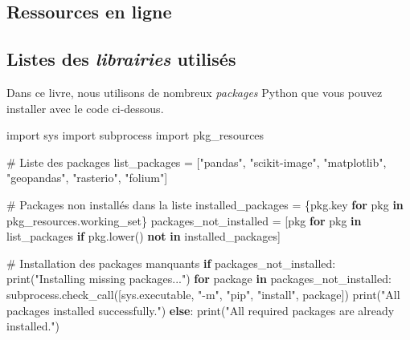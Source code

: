 \documentclass[
  letterpaper,
  DIV=11,
  numbers=noendperiod]{scrreprt}
\newenvironment{Shaded}{\begin{snugshade}}{\end{snugshade}}
\newcommand{\BuiltInTok}[1]{\textcolor[rgb]{0.00,0.23,0.31}{#1}}
\newcommand{\CommentTok}[1]{\textcolor[rgb]{0.37,0.37,0.37}{#1}}
\newcommand{\ControlFlowTok}[1]{\textcolor[rgb]{0.00,0.23,0.31}{\textbf{#1}}}
\newcommand{\ImportTok}[1]{\textcolor[rgb]{0.00,0.46,0.62}{#1}}
\newcommand{\KeywordTok}[1]{\textcolor[rgb]{0.00,0.23,0.31}{\textbf{#1}}}
\newcommand{\NormalTok}[1]{\textcolor[rgb]{0.00,0.23,0.31}{#1}}
\newcommand{\OperatorTok}[1]{\textcolor[rgb]{0.37,0.37,0.37}{#1}}
\newcommand{\StringTok}[1]{\textcolor[rgb]{0.13,0.47,0.30}{#1}}
\begin{document}
\subsection*{Ressources en ligne}\label{ressources-en-ligne}

\subsection*{\texorpdfstring{Listes des \emph{librairies}
utilisés}{Listes des librairies utilisés}}\label{sect0071}

Dans ce livre, nous utilisons de nombreux \emph{packages} Python que
vous pouvez installer avec le code ci-dessous.

\begin{Shaded}
\begin{Highlighting}[]
\ImportTok{import}\NormalTok{ sys}
\ImportTok{import}\NormalTok{ subprocess}
\ImportTok{import}\NormalTok{ pkg\_resources}

\CommentTok{\# Liste des packages}
\NormalTok{list\_packages }\OperatorTok{=}\NormalTok{ [}\StringTok{"pandas"}\NormalTok{, }\StringTok{"scikit{-}image"}\NormalTok{, }\StringTok{"matplotlib"}\NormalTok{, }
                 \StringTok{"geopandas"}\NormalTok{, }\StringTok{"rasterio"}\NormalTok{, }\StringTok{"folium"}\NormalTok{]}

\CommentTok{\# Packages non installés dans la liste}
\NormalTok{installed\_packages }\OperatorTok{=}\NormalTok{ \{pkg.key }\ControlFlowTok{for}\NormalTok{ pkg }\KeywordTok{in}\NormalTok{ pkg\_resources.working\_set\}}
\NormalTok{packages\_not\_installed }\OperatorTok{=}\NormalTok{ [pkg }\ControlFlowTok{for}\NormalTok{ pkg }\KeywordTok{in}\NormalTok{ list\_packages }\ControlFlowTok{if}\NormalTok{ pkg.lower() }\KeywordTok{not} \KeywordTok{in}\NormalTok{ installed\_packages]}

\CommentTok{\# Installation des packages manquants}
\ControlFlowTok{if}\NormalTok{ packages\_not\_installed:}
    \BuiltInTok{print}\NormalTok{(}\StringTok{"Installing missing packages..."}\NormalTok{)}
    \ControlFlowTok{for}\NormalTok{ package }\KeywordTok{in}\NormalTok{ packages\_not\_installed:}
\NormalTok{        subprocess.check\_call([sys.executable, }\StringTok{"{-}m"}\NormalTok{, }\StringTok{"pip"}\NormalTok{, }\StringTok{"install"}\NormalTok{, package])}
    \BuiltInTok{print}\NormalTok{(}\StringTok{"All packages installed successfully."}\NormalTok{)}
\ControlFlowTok{else}\NormalTok{:}
    \BuiltInTok{print}\NormalTok{(}\StringTok{"All required packages are already installed."}\NormalTok{)}
\end{Highlighting}
\end{Shaded}
\end{document}
